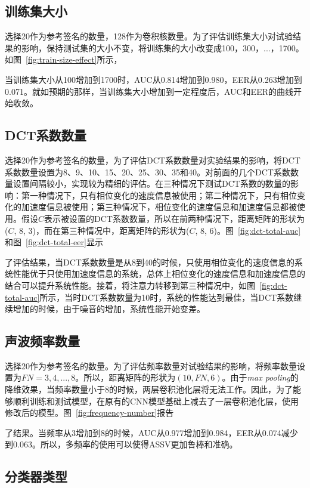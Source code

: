 \subsection{训练集大小}
选择20作为参考签名的数量，128作为卷积核数量。为了评估训练集大小对试验结果的影响，保持测试集的大小不变，将训练集的大小改变成100，300，...，1700。如图~\ref{fig:train-size-effect}所示，

当训练集大小从100增加到1700时，AUC从0.814增加到0.980，EER从0.263增加到0.071。就如预期的那样，当训练集大小增加到一定程度后，AUC和EER的曲线开始收敛。

\subsection{DCT系数数量}
选择20作为参考签名的数量，为了评估DCT系数数量对实验结果的影响，将DCT系数数量设置为8、9、10、15、20、25、30、35和40。对前面的几个DCT系数数量设置间隔较小，实现较为精细的评估。在三种情况下测试DCT系数的数量的影响：第一种情况下，只有相位变化的速度信息被使用；第二种情况下，只有相位变化的加速度信息被使用；第三种情况下，相位变化的速度信息和加速度信息都被使用。假设$C$表示被设置的DCT系数数量，所以在前两种情况下，距离矩阵的形状为($C$, 8, 3)，而在第三种情况中，距离矩阵的形状为($C$, 8, 6)。图~\ref{fig:dct-total-auc}和图~\ref{fig:dct-total-eer}显示

了评估结果，当DCT系数数量是从8到40的时候，只使用相位变化的速度信息的系统性能优于只使用加速度信息的系统，总体上相位变化的速度信息和加速度信息的结合可以提升系统性能。接着，将注意力转移到第三种情况中，如图~\ref{fig:dct-total-auc}所示，当时DCT系数数量为10时，系统的性能达到最佳，当DCT系数继续增加的时候，由于噪音的增加，系统性能开始变差。

\subsection{声波频率数量}
选择20作为参考签名的数量。为了评估频率数量对试验结果的影响，将频率数量设置为$FN=3, 4,..., 8$。所以，距离矩阵的形状为$(10, FN, 6)$。由于\textit{max pooling}的降维效果，当频率数量小于8的时候，两层卷积池化层将无法工作。因此，为了能够顺利训练和测试模型，在原有的CNN模型基础上减去了一层卷积池化层，使用修改后的模型。图~\ref{fig:frequency-number}报告

了结果。当频率从3增加到8的时候，AUC从0.977增加到0.984，EER从0.074减少到0.063。所以，多频率的使用可以使得ASSV更加鲁棒和准确。

\subsection{分类器类型}

